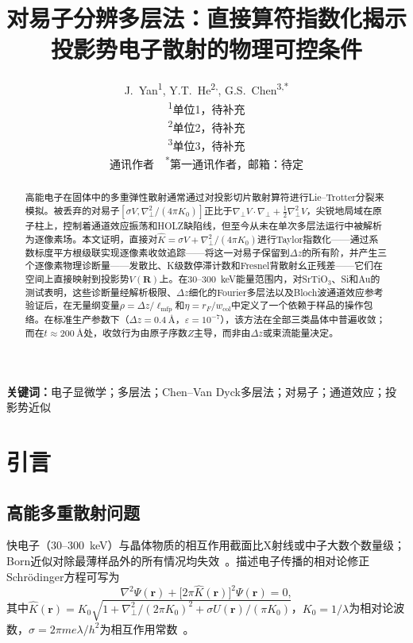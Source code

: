 \documentclass[twoside,11pt]{ctexart}
\title{
  \vspace{-1.5cm}
  \textbf{对易子分辨多层法：直接算符指数化揭示\\投影势电子散射的物理可控条件}
}
\author{
  J.~Yan\textsuperscript{1},
  Y.T.~He\textsuperscript{2,{\dag}},
  G.S.~Chen\textsuperscript{3,*}
  \\
  \small\textsuperscript{1}单位1，待补充 \\
  \small\textsuperscript{2}单位2，待补充 \\
  \small\textsuperscript{3}单位3，待补充 \\
  \small\textsuperscript{\dag}通讯作者~~\textsuperscript{*}第一通讯作者，邮箱：待定
}
\date{}
\begin{document}
\maketitle
\thispagestyle{empty}

\begin{abstract}
高能电子在固体中的多重弹性散射通常通过对投影切片散射算符进行Lie--Trotter分裂来模拟。被丢弃的对易子$[\sigma V,\nabla_\perp^2/(4\pi K_0)]$正比于$\nabla_\perp V\!\cdot\!\nabla_\perp+\tfrac12\nabla_\perp^2 V$，尖锐地局域在原子柱上，控制着通道效应振荡和HOLZ缺陷线，但至今从未在单次多层法运行中被解析为逐像素场。本文证明，直接对$\hat{K}=\sigma V+\nabla_\perp^2/(4\pi K_0)$进行Taylor指数化——通过系数标度平方根级联实现逐像素收敛追踪——将这一对易子保留到$\Delta z$的所有阶，并产生三个逐像素物理诊断量——发散比、K级数停滞计数和Fresnel背散射幺正残差——它们在空间上直接映射到投影势$V(\mathbf{R})$上。在30--300~keV能量范围内，对SrTiO$_3$、Si和Au的测试表明，这些诊断量经解析极限、$\Delta z$细化的Fourier多层法以及Bloch波通道效应参考验证后，在无量纲变量$\rho=\Delta z/\ell_\text{mfp}$和$\eta=r_F/w_\text{col}$中定义了一个依赖于样品的操作包络。在标准生产参数下（$\Delta z=\SI{0.4}{\angstrom}$，$\varepsilon=10^{-7}$），该方法在全部三类晶体中普遍收敛；而在$t\approx\SI{200}{\angstrom}$处，收敛行为由原子序数$Z$主导，而非由$\Delta z$或束流能量决定。
\end{abstract}

\vspace{0.5cm}
\noindent\textbf{关键词：}电子显微学；多层法；Chen--Van Dyck多层法；对易子；通道效应；投影势近似

\newpage

\section{引言}
\setcounter{page}{1}

\subsection{高能多重散射问题}

快电子（30--300~keV）与晶体物质的相互作用截面比X射线或中子大数个数量级；Born近似对除最薄样品外的所有情况均失效~\cite{Kirkland2020,CowleyMoodie1957}。描述电子传播的相对论修正Schr\"odinger方程可写为
\begin{equation}\label{eq:helmholtz}
\nabla^2\Psi(\mathbf{r})+\big[2\pi\hat{K}(\mathbf{r})\big]^2\Psi(\mathbf{r})=0,
\end{equation}
其中$\hat{K}(\mathbf{r})=K_0\sqrt{1+\nabla_\perp^2/(2\pi K_0)^2+\sigma U(\mathbf{r})/(\pi K_0)}$，$K_0=1/\lambda$为相对论波数，$\sigma=2\pi m e\lambda/h^2$为相互作用常数~\cite{ChenVanDyck1997}。
\end{document}
